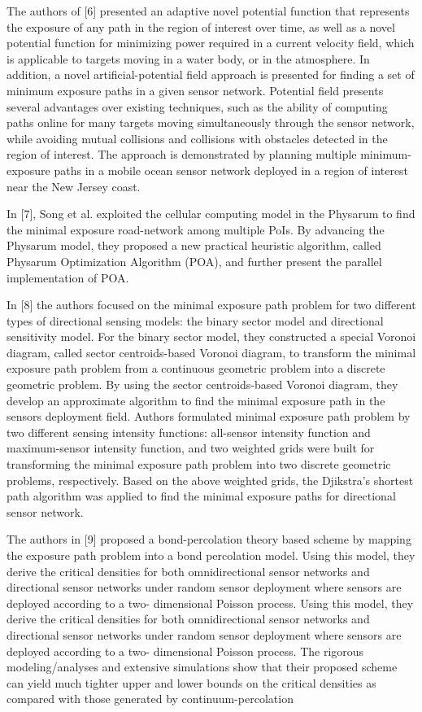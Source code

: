 \documentclass[final]{elsarticle}
\begin{document}
The authors of [6] presented an adaptive novel potential function that represents the exposure of any path in the region of interest over time, as well as a novel potential function for minimizing power required in a current velocity field, which is applicable to targets moving in a water body, or in the atmosphere. In addition, a novel artificial-potential field approach is presented for finding a set of minimum exposure paths in a given sensor network. Potential field presents several advantages over existing techniques, such as the ability of computing paths online for many targets moving simultaneously through the sensor network, while avoiding mutual collisions and collisions with obstacles detected in the region of interest. The approach is demonstrated by planning multiple minimum-exposure paths in a mobile ocean sensor network deployed in a region of interest near the New Jersey coast.

In [7], Song et al. exploited the cellular computing model in the Physarum to find the minimal exposure road-network among multiple PoIs. By advancing the Physarum model, they proposed a new practical heuristic algorithm, called Physarum Optimization Algorithm (POA), and further present the parallel implementation of POA.

In [8] the authors focused on the minimal exposure path problem for two different types of directional sensing models: the binary sector model and directional sensitivity model. For the binary sector model, they constructed a special Voronoi diagram, called sector centroids-based Voronoi diagram, to transform the minimal exposure path problem from a continuous geometric problem into a discrete geometric problem. By using the sector centroids-based Voronoi diagram, they develop an approximate algorithm to find the minimal exposure path in the sensors deployment field. Authors formulated minimal exposure path problem by two different sensing intensity functions: all-sensor intensity function and maximum-sensor intensity function, and two weighted grids were built for transforming the minimal exposure path problem into two discrete geometric problems, respectively. Based on the above weighted grids, the Djikstra’s shortest path algorithm was applied to find the minimal exposure paths for directional sensor network.

The authors in [9] proposed a bond-percolation theory based scheme by mapping the exposure path problem into a bond percolation model. Using this model, they derive the critical densities for both omnidirectional sensor networks and directional sensor networks under random sensor deployment where sensors are deployed according to a two- dimensional Poisson process. Using this model, they derive the critical densities for both omnidirectional sensor networks and directional sensor networks under random sensor deployment where sensors are deployed according to a two- dimensional Poisson process. The rigorous modeling/analyses and extensive simulations show that their proposed scheme can yield much tighter upper and lower bounds on the critical densities as compared with those generated by continuum-percolation
\end{document}
